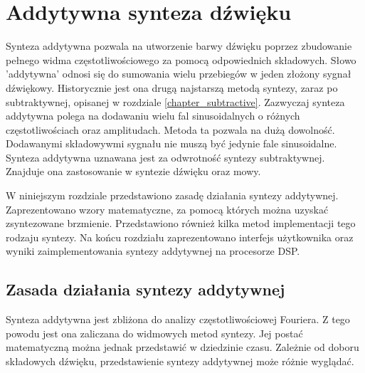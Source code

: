 \chapter{Addytywna synteza dźwięku}\label{chapter_additive}
Synteza addytywna pozwala na utworzenie barwy dźwięku poprzez zbudowanie pełnego widma częstotliwościowego za pomocą odpowiednich składowych. Słowo 'addytywna' odnosi się do sumowania wielu przebiegów w jeden złożony sygnał dźwiękowy. Historycznie jest ona drugą najstarszą metodą syntezy, zaraz po subtraktywnej, opisanej w rozdziale \ref{chapter_subtractive}.
Zazwyczaj synteza addytywna polega na dodawaniu wielu fal sinusoidalnych o różnych częstotliwościach oraz amplitudach. Metoda ta pozwala na dużą dowolność. Dodawanymi składowywmi sygnału nie muszą być jedynie fale sinusoidalne.
Synteza addytywna uznawana jest za odwrotność syntezy subtraktywnej. Znajduje ona zastosowanie w syntezie dźwięku oraz mowy.

W niniejszym rozdziale przedstawiono zasadę działania syntezy addytywnej. Zaprezentowano wzory matematyczne, za pomocą których można uzyskać zsyntezowane brzmienie. Przedstawiono również kilka metod implementacji tego rodzaju syntezy. Na końcu rozdziału zaprezentowano interfejs użytkownika oraz wyniki zaimplementowania syntezy addytywnej na procesorze DSP.

\section{Zasada działania syntezy addytywnej}
Synteza addytywna jest zbliżona do analizy częstotliwościowej Fouriera. Z tego powodu jest ona zaliczana do widmowych metod syntezy. Jej postać matematyczną można jednak przedstawić w dziedzinie czasu. Zależnie od doboru składowych dźwięku, przedstawienie syntezy addytywnej może różnie wyglądać.

